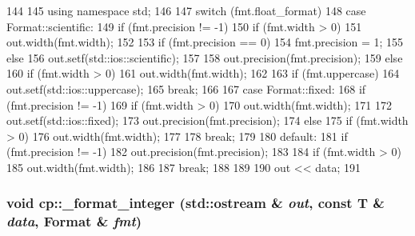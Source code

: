 \begin{DoxyCode}
144 {
145     using namespace std;
146 
147     switch (fmt.float_format) {
148       case Format::scientific:
149         if (fmt.precision != -1) {
150             if (fmt.width > 0)
151                 out.width(fmt.width);
152 
153             if (fmt.precision == 0)
154                 fmt.precision = 1;
155             else
156                 out.setf(std::ios::scientific);
157 
158             out.precision(fmt.precision);
159         } else
160             if (fmt.width > 0)
161                 out.width(fmt.width);
162 
163         if (fmt.uppercase)
164             out.setf(std::ios::uppercase);
165         break;
166 
167       case Format::fixed:
168         if (fmt.precision != -1) {
169             if (fmt.width > 0)
170                 out.width(fmt.width);
171 
172             out.setf(std::ios::fixed);
173             out.precision(fmt.precision);
174         } else
175             if (fmt.width > 0)
176                 out.width(fmt.width);
177 
178         break;
179 
180       default:
181         if (fmt.precision != -1)
182             out.precision(fmt.precision);
183 
184         if (fmt.width > 0)
185             out.width(fmt.width);
186 
187         break;
188     }
189 
190     out << data;
191 }
\end{DoxyCode}
\hypertarget{namespacecp_a5341cb723c5abcaf856cbdf65e182885}{
\subsubsection[{\_\-format\_\-integer}]{\setlength{\rightskip}{0pt plus 5cm}void cp::\_\-format\_\-integer (std::ostream \& {\em out}, \/  const T \& {\em data}, \/  Format \& {\em fmt})}}
\label{namespacecp_a5341cb723c5abcaf856cbdf65e182885}



